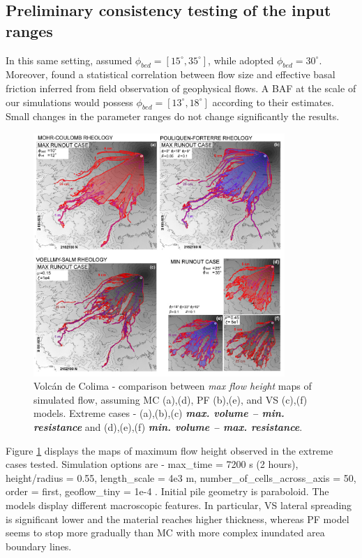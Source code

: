 \documentclass{article}
\begin{document}
\subsection{Preliminary consistency testing of the input ranges}
In this same setting, \citep{Dalbey2008} assumed $\phi_{bed}=[15^\mathrm{\circ}, 35^\mathrm{\circ}]$, while \citep{Capra2011} adopted $\phi_{bed}=30^\mathrm{\circ}$. Moreover, \citep{Spiller2014,Bayarri2015,Ogburn2016} found a statistical correlation between flow size and effective basal friction inferred from field observation of geophysical flows. A BAF at the scale of our simulations would possess $\phi_{bed}=[13^\mathrm{\circ}, 18^\mathrm{\circ}]$ according to their estimates. Small changes in the parameter ranges do not change significantly the results.
\begin{figure}[H]
         \centering
        \includegraphics[width=0.85\textwidth]{figures/Colima/ExtremeMaps.jpg}
        \caption{Volc\'an de Colima - comparison between \emph{max flow height} maps of simulated flow, assuming MC (a),(d), PF (b),(e), and VS (c),(f) models. Extreme cases - (a),(b),(c) \emph{\textbf{max. volume -- min. resistance}} and (d),(e),(f) \emph{\textbf{min. volume -- max. resistance}}.}
        \label{Colima-MaxMinExtents}
\end{figure}
Figure \ref{Colima-MaxMinExtents} displays the maps of maximum flow height observed in the extreme cases tested. Simulation options are - max\_time = 7200 s (2 hours), height/radius = 0.55, length\_scale = 4e3 m, number\_of\_cells\_across\_axis = 50, order = first, geoflow\_tiny = 1e-4 \citep{Patra2005,Aghakhani2016}. Initial pile geometry is paraboloid. The models display different macroscopic features. In particular, VS lateral spreading is significant lower and the material reaches higher thickness, whereas PF model seems to stop more gradually than MC with more complex inundated area boundary lines.
\end{document}

